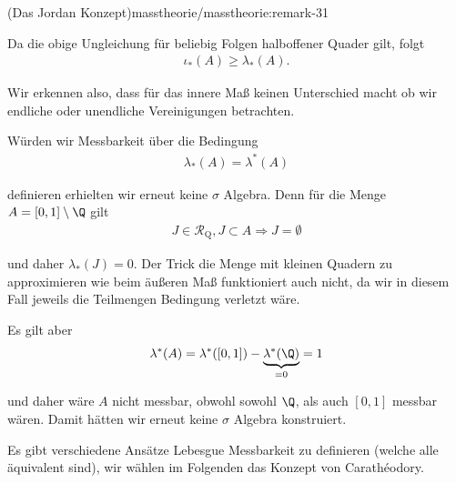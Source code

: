 \documentclass[letterpaper,10pt,english]{jupyterBook}
\begin{document}
\begin{remark}{(Das Jordan Konzept)}{masstheorie/masstheorie:remark-31}
\par
Da die obige Ungleichung für beliebig Folgen halboffener Quader gilt, folgt
\begin{align*}
\iota_\ast(A) \geq \lambda_\ast(A).
\end{align*}
\par
Wir erkennen also, dass für das innere Maß keinen Unterschied macht ob wir endliche oder unendliche Vereinigungen betrachten.

\par
Würden wir Messbarkeit über die Bedingung
\begin{align*}
\lambda_\ast(A)=\lambda^\ast(A)
\end{align*}
\par
definieren erhielten wir erneut keine \(\sigma\) Algebra. Denn für die Menge \(A=[0,1]\setminus\Q\) gilt
\begin{align*}
J\in\mathcal{R}_{\text{Q}}, J\subset A\Rightarrow J=\emptyset
\end{align*}
\par
und daher \(\lambda_\ast(J) = 0\). Der Trick die Menge mit kleinen Quadern zu approximieren wie beim äußeren Maß funktioniert auch nicht, da wir in diesem Fall jeweils die Teilmengen Bedingung verletzt wäre.

\par
Es gilt aber
\begin{align*}
\lambda^\ast(A) = \lambda^\ast([0,1]) - \underbrace{\lambda^\ast(\Q)}_{=0} = 1
\end{align*}
\par
und daher wäre \(A\) nicht messbar, obwohl sowohl \(\Q\), als auch \([0,1]\) messbar wären. Damit hätten wir erneut keine \(\sigma\) Algebra konstruiert.
\end{remark}

\par
Es gibt verschiedene Ansätze Lebesgue Messbarkeit zu definieren (welche alle äquivalent sind), wir wählen im Folgenden das Konzept von
Carathéodory.
\end{document}
